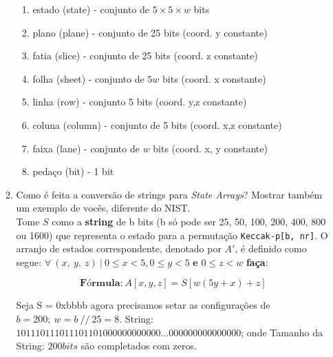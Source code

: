 \documentclass[12pt, a4paper]{article}
\begin{document}
\begin{enumerate}
\begin{enumerate}
\begin{enumerate}
\item estado (state) - conjunto de $5\times 5\times w$ bits
\item plano (plane) - conjunto de 25 bits (coord. y constante)
\item fatia (slice) - conjunto de 25 bits (coord. z constante)
\item folha (sheet) - conjunto de $5w$ bits (coord. x constante)
\item linha (row) - conjunto 5 bits (coord. y,z constante)
\item coluna (column) - conjunto de 5 bits (coord. x,z constante)
\item faixa (lane) - conjunto de $w$ bits (coord. x, y constante)
\item pedaço (bit) - 1 bit
\end{enumerate}

\item Como é feita a conversão de strings para \textit{State Arrays}? Mostrar
também um exemplo de vocês, diferente do NIST.\\

Tome $S$ como a \textbf{string} de b bits (b só pode ser 25, 50, 100, 200, 400,
800 ou 1600) que representa o estado para a permutação \verb|Keccak-p[b, nr]|.
O arranjo de estados correspondente, denotado por $A'$, é definido como segue:
$\forall\ (x,\ y,\ z)\ |\ 0 \le x < 5, 0 \le y < 5$ \textbf{e} $0 \le z < w$
\textbf{faça}:

$$\textbf{Fórmula:}\ A[x, y, z] = S[w(5y + x) + z]$$

Seja S = 0xbbbb agora precisamos setar as configurações de $b = 200;\ w = b\
//\ 25 = 8$. String: $101110111011101101000000000000\ldots000000000000000$; onde
Tamanho da String: $200 bits$ são completados com zeros.\\


\end{enumerate}
\end{enumerate}
\end{document}
